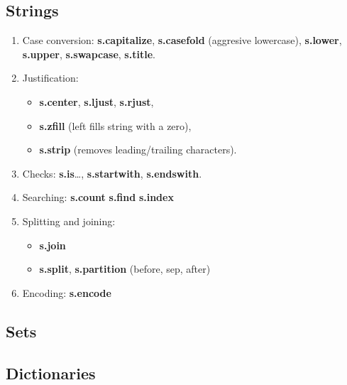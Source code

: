 \documentclass[a4paper, twoside, 8pt]{extarticle}
\newenvironment{enumx} {
	\begin{enumerate}[leftmargin=*]
	\setlength{\topsep}{0pt}
	\setlength{\itemsep}{0pt}
	\setlength{\parskip}{0pt}
	\setlength{\parsep}{0pt}
	}
{\end{enumerate}}
\newenvironment{itemx} {
	\begin{itemize}[leftmargin=*,noitemsep,topsep=0pt]
	}
{\end{itemize}}
\newcommand{\python}[1] {\textbf{\color{blue}#1}}
\begin{document}
\begin{multicols*}{3}
\subsection{Strings}
\begin{enumx}
\item Case conversion: 
\python{s.capitalize}, 
\python{s.casefold} (aggresive lowercase), 
\python{s.lower}, 
\python{s.upper}, 
\python{s.swapcase}, 
\python{s.title}.

\item Justification: 
\begin{itemx}
	\item \python{s.center},
		  \python{s.ljust},
	      \python{s.rjust},

	\item \python{s.zfill} 
	(left fills string with a zero),

	\item \python{s.strip} 
	(removes leading/trailing characters).
\end{itemx}

\item Checks:
\python{s.is}\ldots,
\python{s.startwith}, 
\python{s.endswith}.

\item Searching:
\python{s.count} 
\python{s.find} 
\python{s.index} 

\item Splitting and joining:
\begin{itemx}
	\item \python{s.join} 
	\item \python{s.split},
	      \python{s.partition} (before, sep, after)
\end{itemx}

\item Encoding: 
\python{s.encode} 
\end{enumx}

\subsection{Sets}

\subsection{Dictionaries}

\end{multicols*}
\end{document}
